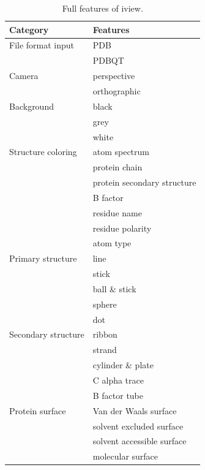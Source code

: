 \begin{table}
\caption{Full features of iview.}
\label{tbl:features}
\begin{tabular}{ll}
\hline
                 Category & Features\\
\hline
        File format input & PDB\\
                          & PDBQT\\
\hline
                   Camera & perspective\\
                          & orthographic\\
\hline
               Background & black\\
                          & grey\\
                          & white\\
\hline
       Structure coloring & atom spectrum\\
                          & protein chain\\
                          & protein secondary structure\\
                          & B factor\\
                          & residue name\\
                          & residue polarity\\
                          & atom type\\
\hline
        Primary structure & line\\
                          & stick\\
                          & ball \& stick\\
                          & sphere\\
                          & dot\\
\hline
      Secondary structure & ribbon\\
                          & strand\\
                          & cylinder \& plate\\
                          & C alpha trace\\
                          & B factor tube\\
\hline
          Protein surface & Van der Waals surface\\
                          & solvent excluded surface\\
                          & solvent accessible surface\\
                          & molecular surface\\

\end{tabular}
\end{table}
